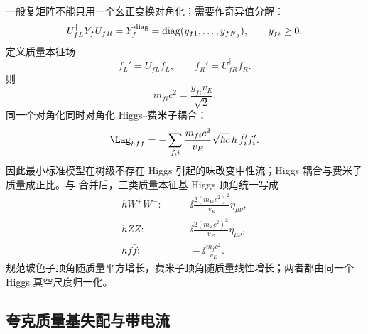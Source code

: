\begin{proposition}
一般复矩阵不能只用一个幺正变换对角化；需要作奇异值分解：
\begin{equation}
 {
 U_{fL}^\dagger Y_fU_{fR}
 =Y_f^{\rm diag}
 =\operatorname{diag}(y_{f1},\ldots,y_{fN_g}),
 \qquad y_{fi}\ge0.}
 \label{eq:yukawa-svd-dp11}
\end{equation}
定义质量本征场
\begin{equation}
 f_L'=U_{fL}^\dagger f_L,
 \qquad
 f_R'=U_{fR}^\dagger f_R.
 \label{eq:mass-basis-fields-dp11}
\end{equation}
则
\begin{equation}
 {m_{fi}c^2=\frac{y_{fi}v_E}{\sqrt2}.}
 \label{eq:fermion-masses-yukawa-dp11}
\end{equation}
同一个对角化同时对角化 Higgs--费米子耦合：
\begin{equation}
 {
 \Lag_{hff}
 =-\sum_{f,i}
 \frac{m_{fi}c^2}{v_E}
 \sqrt{\hbar c}\,h\,\bar f_i'f_i'.}
 \label{eq:higgs-fermion-coupling-dp11}
\end{equation}
因此最小标准模型在树级不存在 Higgs 引起的味改变中性流；Higgs 耦合与费米子质量成正比。与 合并后，三类质量本征基 Higgs 顶角统一写成
\begin{align}
 hW^+W^-:&\qquad \ii\frac{2(m_Wc^2)^2}{v_E}\eta_{\mu\nu},\\
 hZZ:&\qquad \ii\frac{2(m_Zc^2)^2}{v_E}\eta_{\mu\nu},\\
 hf\bar f:&\qquad -\ii\frac{m_fc^2}{v_E}.
 \label{eq:sm-higgs-massbasis-rules-dp11}
\end{align}
规范玻色子顶角随质量平方增长，费米子顶角随质量线性增长；两者都由同一个 Higgs 真空尺度归一化。
\end{proposition}



\subsection{夸克质量基失配与带电流}

